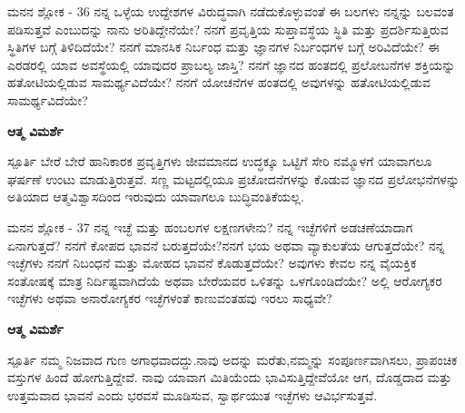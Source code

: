 
\newpage
\begin{mananam}{\mananamfont ಮನನ ಶ್ಲೋಕ - \textenglish{36}}
\footnotesize \mananamtext ನನ್ನ ಒಳ್ಳೆಯ ಉದ್ದೇಶಗಳ ವಿರುದ್ಧವಾಗಿ ನಡೆದುಕೊಳ್ಳುವಂತೆ ಈ ಬಲಗಳು ನನ್ನನ್ನು ಬಲವಂತ ಪಡಿಸುತ್ತವೆ ಎಂಬುದನ್ನು ನಾನು 
 ಅರಿತಿದ್ದೇನೆಯೇ? ನನಗೆ ಪ್ರವೃತ್ತಿಯ ಸುಪ್ತಾವಸ್ಥೆಯ    ಸ್ಥಿತಿ ಮತ್ತು ಪ್ರದರ್ಶಿಸುತ್ತಿರುವ ಸ್ಥಿತಿಗಳ ಬಗ್ಗೆ ತಿಳಿದಿದೆಯೇ? ನನಗೆ ಮಾನಸಿಕ ನಿರ್ಬಂಧ ಮತ್ತು ಜ್ಞಾನಗಳ ನಿರ್ಬಂಧಗಳ ಬಗ್ಗೆ ಅರಿವಿದೆಯೇ? ಈ ಎರಡರಲ್ಲಿ ಯಾವ ಅವಸ್ಥೆಯಲ್ಲಿ ಯಾವುದರ ಪ್ರಾಬಲ್ಯ ಜಾಸ್ತಿ? ನನಗೆ ಜ್ಞಾನದ ಹಂತದಲ್ಲಿ ಪ್ರಲೋಬನೆಗಳ ಶಕ್ತಿಯನ್ನು ಹತೋಟಿಯಲ್ಲಿಡುವ ಸಾಮರ್ಥ್ಯವಿದೆಯೇ? ನನಗೆ ಯೋಚನೆಗಳ ಹಂತದಲ್ಲಿ ಅವುಗಳನ್ನು ಹತೋಟಿಯಲ್ಲಿಡುವ ಸಾಮರ್ಥ್ಯವಿದೆಯೇ?
\end{mananam}
\WritingHand\enspace\textbf{ಆತ್ಮ ವಿಮರ್ಶೆ}\\
\begin{inspiration}{\mananamfont ಸ್ಪೂರ್ತಿ}
\footnotesize \mananamtext ಬೇರೆ ಬೇರೆ ಹಾನಿಕಾರಕ ಪ್ರವೃತ್ತಿಗಳು ಜೀವಮಾನದ ಉದ್ಧಕ್ಕೂ ಒಟ್ಟಿಗೆ ಸೇರಿ ನಮ್ಮೊಳಗೆ ಯಾವಾಗಲೂ ಘರ್ಷಣೆ ಉಂಟು ಮಾಡುತ್ತಿರುತ್ತವೆ. ಸಣ್ಣ ಮಟ್ಟದಲ್ಲಿಯೂ ಪ್ರಚೋದನೆಗಳನ್ನು ಕೊಡುವ ಜ್ಞಾನದ ಪ್ರಲೋಭನೆಗಳನ್ನು ಅತಿಯಾದ ಆತ್ಮವಿಶ್ವಾಸದಿಂದ ಇರುವುದು ಯಾವಾಗಲೂ ಬುದ್ಧಿವಂತಿಕೆಯಲ್ಲ.
\end{inspiration}
\newpage


\newpage
\begin{mananam}{\mananamfont ಮನನ ಶ್ಲೋಕ - \textenglish{37}}
\footnotesize \mananamtext ನನ್ನ ಇಚ್ಛೆ ಮತ್ತು ಹಂಬಲಗಳ ಲಕ್ಷಣಗಳೇನು? ನನ್ನ ಇಚ್ಛೆಗಳಿಗೆ ಅಡಚಣೆಯಾದಾಗ ಏನಾಗುತ್ತದೆ? ನನಗೆ ಕೋಪದ ಭಾವನೆ ಬರುತ್ತದೆಯೇ?ನನಗೆ ಭಯ ಅಥವಾ ವ್ಯಾಕುಲತೆಯ ಆಗುತ್ತದೆಯೇ? ನನ್ನ ಇಚ್ಛೆಗಳು ನನಗೆ ನಿಬಂಧನೆ ಮತ್ತು ಮೋಹದ ಭಾವನೆ ಕೊಡುತ್ತದೆಯೇ? ಅವುಗಳು ಕೇವಲ ನನ್ನ ವೈಯಕ್ತಿಕ ಸಂತೋಷಕ್ಕೆ ಮಾತ್ರ ನಿರ್ದಿಷ್ಟವಾಗಿದೆಯೆ ಅಥವಾ ಬೇರೆಯವರ ಒಳಿತನ್ನು ಒಳಗೊಂಡಿದೆಯೇ? ಅಲ್ಲಿ ಆರೋಗ್ಯಕರ ಇಚ್ಛೆಗಳು ಅಥವಾ ಅನಾರೋಗ್ಯಕರ ಇಚ್ಛೆಗಳಂತೆ ಕಾಣುವಂತಹವು ಇರಲು ಸಾಧ್ಯವೇ?
\end{mananam}
\WritingHand\enspace\textbf{ಆತ್ಮ ವಿಮರ್ಶೆ}\\
\begin{inspiration}{\mananamfont ಸ್ಪೂರ್ತಿ}
\footnotesize \mananamtext ನಮ್ಮ ನಿಜವಾದ ಗುಣ ಅಗಾಧವಾದದ್ದು.ನಾವು ಅದನ್ನು ಮರೆತು,ನಮ್ಮನ್ನು ಸಂಪೂರ್ಣವಾಗಿಸಲು, ಪ್ರಾಪಂಚಿಕ ವಸ್ತುಗಳ ಹಿಂದೆ ಹೋಗುತ್ತಿದ್ದೇವೆ. ನಾವು ಯಾವಾಗ ಮಿತಿಯೆಂದು ಭಾವಿಸುತ್ತಿದ್ದೇವೆಯೋ ಆಗ, ದೊಡ್ಡದಾದ ಮತ್ತು ಉತ್ತಮವಾದ ಭಾವನೆ ಎಂದು ಭರವಸೆ ಮೂಡಿಸುವ, ಸ್ವಾರ್ಥಯುತ ಇಚ್ಛೆಗಳು ಆವಿರ್ಭಸುತ್ತವೆ. 
\end{inspiration}
\newpage

